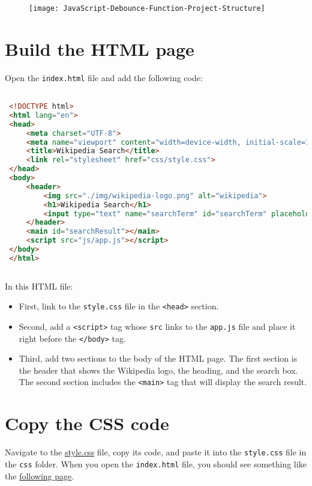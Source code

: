 \documentclass[11pt]{article}
\begin{document}
\begin{figure}[h]
\centering
\texttt{[image: JavaScript-Debounce-Function-Project-Structure]}
\end{figure}
\section*{Build the HTML page}
\newpage
Open the \verb|index.html| file and add the following code:

\begin{lstlisting}[language=HTML]

 <!DOCTYPE html>
 <html lang="en">
 <head>
     <meta charset="UTF-8">
     <meta name="viewport" content="width=device-width, initial-scale=1.0">
     <title>Wikipedia Search</title>
     <link rel="stylesheet" href="css/style.css">
 </head>
 <body>
     <header>
         <img src="./img/wikipedia-logo.png" alt="wikipedia">
         <h1>Wikipedia Search</h1>
         <input type="text" name="searchTerm" id="searchTerm" placeholder="Enter a search term...">
     </header>
     <main id="searchResult"></main>
     <script src="js/app.js"></script>
 </body>
 </html>
 
\end{lstlisting}

In this HTML file:

\begin{itemize}
\item First, link to the \verb|style.css| file in the \verb|<head>| section.
\item Second, add a \verb|<script>| tag whose \verb|src| links to the \verb|app.js| file
and place it right before the \verb|</body>| tag.
\item Third, add two sections to the body of the HTML page.
The first section is the header that shows the Wikipedia logo, the
heading, and the search box. The second section includes the \verb|<main>|
tag that will display the search result.
\end{itemize}

\section*{Copy the CSS code}

Navigate to the \href{https://www.javascripttutorial.net/sample/dom/wikipedia-search/css/style.css}{style.css} file, copy its code, and paste it into the
\verb|style.css| file in the \verb|css| folder. When you open the \verb|index.html| file,
you should see something like the \href{https://www.javascripttutorial.net/sample/dom/wikipedia-search/}{following page}.
\end{document}
